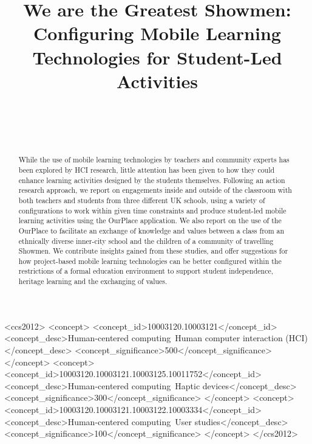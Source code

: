 \documentclass[,hyphens]{sigchi}
\begin{document}
\title{We are the Greatest Showmen: Configuring Mobile Learning Technologies for Student-Led Activities}

\author{%
  \\
  \\
  \\
}

\maketitle

\begin{abstract}
While the use of mobile learning technologies by teachers and community experts has been explored by HCI research, little attention has been given to how they could enhance learning activities designed by the students themselves. Following an action research approach, we report on engagements inside and outside of the classroom with both teachers and students from three different UK schools, using a variety of configurations to work within given time constraints and produce student-led mobile learning activities using the OurPlace application. We also report on the use of the OurPlace to facilitate an exchange of knowledge and values between a class from an ethnically diverse inner-city school and the children of a community of travelling Showmen. We contribute insights gained from these studies, and offer suggestions for how project-based mobile learning technologies can be better configured within the restrictions of a formal education environment to support student independence, heritage learning and the exchanging of values.
\end{abstract}



\begin{CCSXML}
<ccs2012>
<concept>
<concept_id>10003120.10003121</concept_id>
<concept_desc>Human-centered computing~Human computer interaction (HCI)</concept_desc>
<concept_significance>500</concept_significance>
</concept>
<concept>
<concept_id>10003120.10003121.10003125.10011752</concept_id>
<concept_desc>Human-centered computing~Haptic devices</concept_desc>
<concept_significance>300</concept_significance>
</concept>
<concept>
<concept_id>10003120.10003121.10003122.10003334</concept_id>
<concept_desc>Human-centered computing~User studies</concept_desc>
<concept_significance>100</concept_significance>
</concept>
</ccs2012>
\end{CCSXML}
\end{document}

